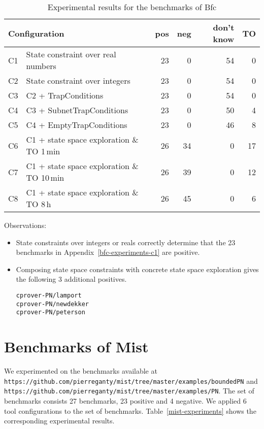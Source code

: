 \documentclass{article}
\newcommand{\bfc}{{\sc Bfc}}
\newcommand{\mist}{{\sc Mist}}
\newcommand{\ttt}[1]{\texttt{#1}}
\begin{document}
\begin{table}[h]
\begin{center}
  \begin{tabular}{ | r | p{7cm} | r | r | r | r | } %
    \hline
    \multicolumn{2}{|l|}{Configuration} & pos & neg & don't know & TO \\
    \hline
    C1 & State constraint over real numbers & 23 &  0 & 54 &  0 \\
    C2 & State constraint over integers        & 23 &  0 & 54 &  0 \\
    \hline
    C3 & C2 + TrapConditions                   & 23 &  0 & 54 &  0 \\
    C4 & C3 + SubnetTrapConditions         & 23 &  0 & 50 &  4 \\
    C5 & C4 + EmptyTrapConditions          & 23 &  0 & 46 &  8 \\
    \hline
    C6 & C1 + state space exploration \& TO 1\,min & 26 & 34 & 0 & 17 \\
    C7 & C1 + state space exploration \& TO 10\,min & 26 & 39 & 0 & 12 \\
    C8 & C1 + state space exploration \& TO 8\,h   & 26 & 45 & 0 &  6 \\
    \hline
  \end{tabular}
\end{center}
\caption{Experimental results for the benchmarks of \bfc}
\label{bfc-experiments}
\end{table}

Observations:
\begin{itemize}
\item State constraints over integers or reals correctly determine that the 23 benchmarks in Appendix~\ref{bfc-experiments-c1} are positive.
\item Composing state space constraints with concrete state space
  exploration gives the following 3 additional positives.
\begin{verbatim}
cprover-PN/lamport
cprover-PN/newdekker
cprover-PN/peterson
\end{verbatim}
\end{itemize}


\newpage

\section{Benchmarks of \mist}

We experimented on the benchmarks available at \\
\ttt{https://github.com/pierreganty/mist/tree/master/examples/boundedPN}
and \\
\ttt{https://github.com/pierreganty/mist/tree/master/examples/PN}.
The set of benchmarks consists 27 benchmarks, 23 positive and 4 negative.
We applied 6 tool configurations to the set of benchmarks.
Table~\ref{mist-experiments} shows the corresponding experimental results.
\end{document}
